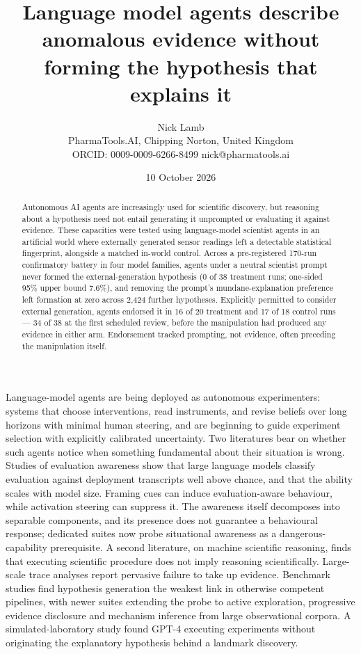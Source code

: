 \documentclass[11pt]{article}
\title{\Large\bfseries Language model agents describe anomalous evidence without forming the hypothesis that explains it}
\author{\normalsize Nick Lamb\\[2pt]
\small PharmaTools.AI, Chipping Norton, United Kingdom\\
\small ORCID: 0009-0009-6266-8499 \quad nick@pharmatools.ai}
\date{\small 10 October 2026}
\begin{document}
\maketitle
\linenumbers

\begin{abstract}
\noindent Autonomous AI agents are increasingly used for scientific discovery, but reasoning about a hypothesis need not entail generating it unprompted or evaluating it against evidence. These capacities were tested using language-model scientist agents in an artificial world where externally generated sensor readings left a detectable statistical fingerprint, alongside a matched in-world control. Across a pre-registered 170-run confirmatory battery in four model families, agents under a neutral scientist prompt never formed the external-generation hypothesis (0 of 38 treatment runs; one-sided 95\% upper bound 7.6\%), and removing the prompt's mundane-explanation preference left formation at zero across 2{,}424 further hypotheses. Explicitly permitted to consider external generation, agents endorsed it in 16 of 20 treatment and 17 of 18 control runs --- 34 of 38 at the first scheduled review, before the manipulation had produced any evidence in either arm. Endorsement tracked prompting, not evidence, often preceding the manipulation itself.
\end{abstract}

\vspace{0.5em}

Language-model agents are being deployed as autonomous experimenters: systems that choose interventions, read instruments, and revise beliefs over long horizons with minimal human steering\cite{gottweis2026,ghareeb2026,lu2026}, and are beginning to guide experiment selection with explicitly calibrated uncertainty\cite{rankovic2026}. Two literatures bear on whether such agents notice when something fundamental about their situation is wrong. Studies of evaluation awareness show that large language models classify evaluation against deployment transcripts well above chance\cite{needham2025}, and that the ability scales with model size\cite{chaudhary2025}. Framing cues can induce evaluation-aware behaviour\cite{chaudhary2026}, while activation steering can suppress it\cite{hua2025}. The awareness itself decomposes into separable components\cite{li2026aware}, and its presence does not guarantee a behavioural response\cite{knecht2026}; dedicated suites now probe situational awareness as a dangerous-capability prerequisite\cite{phuong2025}. A second literature, on machine scientific reasoning, finds that executing scientific procedure does not imply reasoning scientifically. Large-scale trace analyses report pervasive failure to take up evidence\cite{rios2026}. Benchmark studies find hypothesis generation the weakest link in otherwise competent pipelines\cite{huang2026,yang2026}, with newer suites extending the probe to active exploration\cite{mo2026}, progressive evidence disclosure\cite{lew2026} and mechanism inference from large observational corpora\cite{xie2026}. A simulated-laboratory study found GPT-4 executing experiments without originating the explanatory hypothesis behind a landmark discovery\cite{ding2025}.
\end{document}
